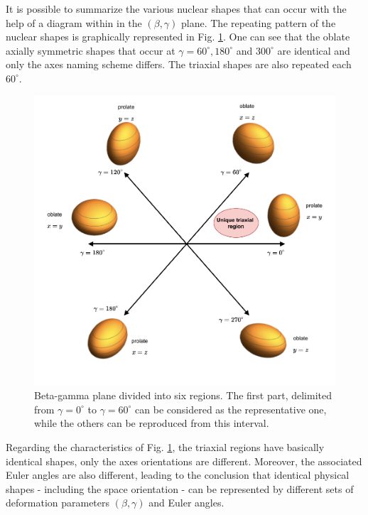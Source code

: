 It is possible to summarize the various nuclear shapes that can occur with the help of a diagram within in the $(\beta,\gamma)$ plane. The repeating pattern of the nuclear shapes is graphically represented in Fig. \ref{beta-gamma-plane}. One can see that the oblate axially symmetric shapes that occur at $\gamma=60^\circ,180^\circ$ and $300^\circ$ are identical and only the axes naming scheme differs. The triaxial shapes are also repeated each $60^\circ$.

\begin{figure}
    \centering
    \includegraphics[scale=0.65]{Chapters/Figures/beta_gamma_plane.pdf}
    \caption{Beta-gamma plane divided into six regions. The first part, delimited from $\gamma=0^\circ$ to $\gamma=60^\circ$ can be considered as the representative one, while the others can be reproduced from this interval.}
    \label{beta-gamma-plane}
\end{figure}

Regarding the characteristics of Fig. \ref{beta-gamma-plane}, the triaxial regions have basically identical shapes, only the axes orientations are different. Moreover, the associated Euler angles are also different, leading to the conclusion that identical physical shapes - including the space orientation - can be represented by different sets of deformation parameters $(\beta,\gamma)$ and Euler angles.

